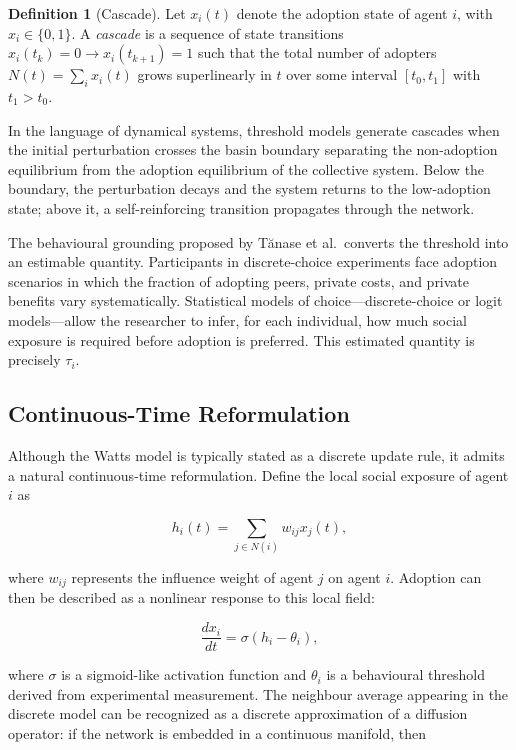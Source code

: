 \documentclass[12pt,a4paper]{article}
\theoremstyle{plain}
\theoremstyle{definition}
\newtheorem{definition}[theorem]{Definition}
\begin{document}
\begin{definition}[Cascade]
\label{def:cascade}
Let $x_i(t)$ denote the adoption state of agent $i$, with $x_i \in \{0,1\}$. A \emph{cascade} is a sequence of state transitions $x_i(t_k) = 0 \to x_i(t_{k+1}) = 1$ such that the total number of adopters $N(t) = \sum_i x_i(t)$ grows superlinearly in $t$ over some interval $[t_0, t_1]$ with $t_1 > t_0$.
\end{definition}

In the language of dynamical systems, threshold models generate cascades when the initial perturbation crosses the basin boundary separating the non-adoption equilibrium from the adoption equilibrium of the collective system. Below the boundary, the perturbation decays and the system returns to the low-adoption state; above it, a self-reinforcing transition propagates through the network.

The behavioural grounding proposed by Tănase et al.\ converts the threshold into an estimable quantity. Participants in discrete-choice experiments face adoption scenarios in which the fraction of adopting peers, private costs, and private benefits vary systematically. Statistical models of choice—discrete-choice or logit models—allow the researcher to infer, for each individual, how much social exposure is required before adoption is preferred. This estimated quantity is precisely $\tau_i$.

\subsection{Continuous-Time Reformulation}

Although the Watts model is typically stated as a discrete update rule, it admits a natural continuous-time reformulation. Define the local social exposure of agent $i$ as

\begin{equation}
h_i(t) = \sum_{j \in N(i)} w_{ij} x_j(t),
\end{equation}

where $w_{ij}$ represents the influence weight of agent $j$ on agent $i$. Adoption can then be described as a nonlinear response to this local field:

\begin{equation}
\frac{dx_i}{dt} = \sigma(h_i - \theta_i),
\end{equation}

where $\sigma$ is a sigmoid-like activation function and $\theta_i$ is a behavioural threshold derived from experimental measurement. The neighbour average appearing in the discrete model can be recognized as a discrete approximation of a diffusion operator: if the network is embedded in a continuous manifold, then
\end{document}
